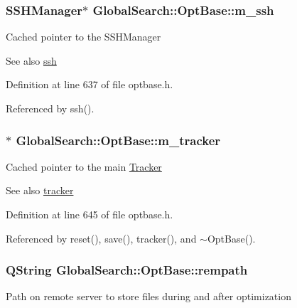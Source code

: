 \subsubsection[{m\+\_\+ssh}]{\setlength{\rightskip}{0pt plus 5cm}S\+S\+H\+Manager$\ast$ Global\+Search\+::\+Opt\+Base\+::m\+\_\+ssh\hspace{0.3cm}{\ttfamily [protected]}}\label{classGlobalSearch_1_1OptBase_a723a6dd0bb93aff451007ccb079e2f65}
Cached pointer to the S\+S\+H\+Manager \begin{DoxySeeAlso}{See also}
\hyperlink{classGlobalSearch_1_1OptBase_a40064a3c1e6d0acae26b1908a8bdf5db}{ssh} 
\end{DoxySeeAlso}


Definition at line 637 of file optbase.\+h.



Referenced by ssh().

\hypertarget{classGlobalSearch_1_1OptBase_a60a2c6053a8ae3716854c68d0837b921}{}
\subsubsection[{m\+\_\+tracker}]{$\ast$ Global\+Search\+::\+Opt\+Base\+::m\+\_\+tracker\hspace{0.3cm}{\ttfamily [protected]}}\label{classGlobalSearch_1_1OptBase_a60a2c6053a8ae3716854c68d0837b921}
Cached pointer to the main \hyperlink{classGlobalSearch_1_1Tracker}{Tracker} \begin{DoxySeeAlso}{See also}
\hyperlink{classGlobalSearch_1_1OptBase_a304d0d10064bd3913c8089aca76067d6}{tracker} 
\end{DoxySeeAlso}


Definition at line 645 of file optbase.\+h.



Referenced by reset(), save(), tracker(), and $\sim$\+Opt\+Base().

\hypertarget{classGlobalSearch_1_1OptBase_a777ad7fbedbb76f522e02ca73883ab7d}{}
\subsubsection[{rempath}]{\setlength{\rightskip}{0pt plus 5cm}Q\+String Global\+Search\+::\+Opt\+Base\+::rempath}\label{classGlobalSearch_1_1OptBase_a777ad7fbedbb76f522e02ca73883ab7d}
Path on remote server to store files during and after optimization 

